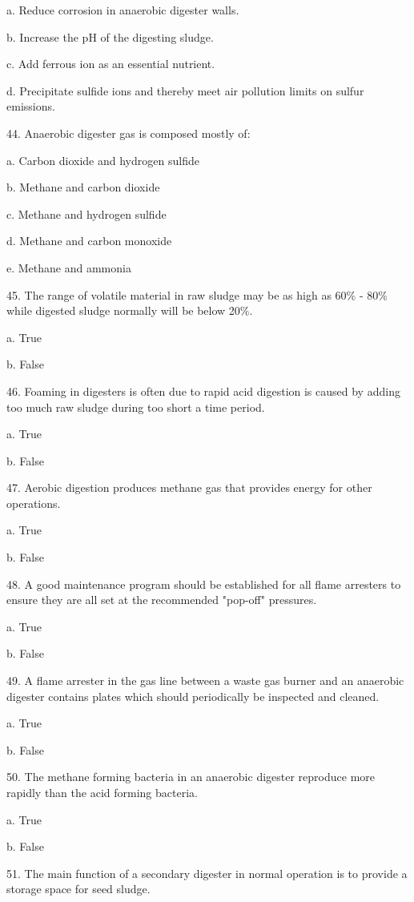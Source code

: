 \documentclass{article}
\begin{document}
a. Reduce corrosion in anaerobic digester walls. 

b. Increase the pH of the digesting sludge. 

c. Add ferrous ion as an essential nutrient. 

d. Precipitate sulfide ions and thereby meet air pollution limits on sulfur emissions. 


44. Anaerobic digester gas is composed mostly of:

a. Carbon dioxide and hydrogen sulfide 

b. Methane and carbon dioxide 

c. Methane and hydrogen sulfide 

d. Methane and carbon monoxide 

e. Methane and ammonia 


45. The range of volatile material in raw sludge may be as high as 60\% - 80\% while digested sludge normally will be below 20\%. 

a. True 

b. False 


46. Foaming in digesters is often due to rapid acid digestion is caused by adding too much raw sludge during too short a time period. 

a. True 

b. False 


47. Aerobic digestion produces methane gas that provides energy for other operations. 

a. True 

b. False 


48. A good maintenance program should be established for all flame arresters to ensure they are all set at the recommended "pop-off" pressures. 

a. True 

b. False 


49. A flame arrester in the gas line between a waste gas burner and an anaerobic digester contains plates which should periodically be inspected and cleaned. 

a. True 

b. False 


50. The methane forming bacteria in an anaerobic digester reproduce more rapidly than the acid forming bacteria. 

a. True 

b. False 


51. The main function of a secondary digester in normal operation is to provide a storage space for seed sludge. 
\end{document}
